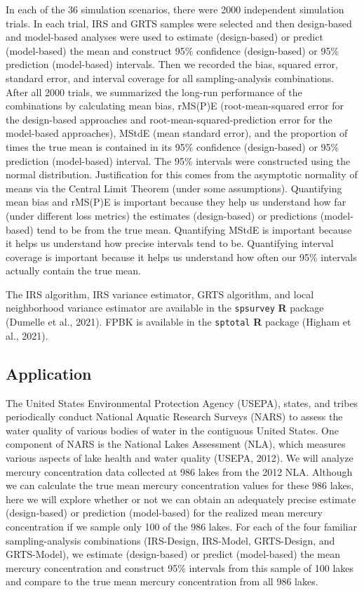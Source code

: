 \documentclass[]{elsarticle} %
\begin{document}
In each of the 36 simulation scenarios, there were 2000 independent
simulation trials. In each trial, IRS and GRTS samples were selected and
then design-based and model-based analyses were used to estimate
(design-based) or predict (model-based) the mean and construct 95\%
confidence (design-based) or 95\% prediction (model-based) intervals.
Then we recorded the bias, squared error, standard error, and interval
coverage for all sampling-analysis combinations. After all 2000 trials,
we summarized the long-run performance of the combinations by
calculating mean bias, rMS(P)E (root-mean-squared error for the
design-based approaches and root-mean-squared-prediction error for the
model-based approaches), MStdE (mean standard error), and the proportion
of times the true mean is contained in its 95\% confidence
(design-based) or 95\% prediction (model-based) interval. The 95\%
intervals were constructed using the normal distribution. Justification
for this comes from the asymptotic normality of means via the Central
Limit Theorem (under some assumptions). Quantifying mean bias and
rMS(P)E is important because they help us understand how far (under
different loss metrics) the estimates (design-based) or predictions
(model-based) tend to be from the true mean. Quantifying MStdE is
important because it helps us understand how precise intervals tend to
be. Quantifying interval coverage is important because it helps us
understand how often our 95\% intervals actually contain the true mean.

The IRS algorithm, IRS variance estimator, GRTS algorithm, and local
neighborhood variance estimator are available in the \texttt{spsurvey}
\textbf{\textsf{R}} package (Dumelle et al., 2021). FPBK is available in
the \texttt{sptotal} \textbf{\textsf{R}} package (Higham et al., 2021).

\hypertarget{sec:mm_app}{%
\subsection{Application}\label{sec:mm_app}}

The United States Environmental Protection Agency (USEPA), states, and
tribes periodically conduct National Aquatic Research Surveys (NARS) to
assess the water quality of various bodies of water in the contiguous
United States. One component of NARS is the National Lakes Assessment
(NLA), which measures various aspects of lake health and water quality
(USEPA, 2012). We will analyze mercury concentration data collected at
986 lakes from the 2012 NLA. Although we can calculate the true mean
mercury concentration values for these 986 lakes, here we will explore
whether or not we can obtain an adequately precise estimate
(design-based) or prediction (model-based) for the realized mean mercury
concentration if we sample only 100 of the 986 lakes. For each of the
four familiar sampling-analysis combinations (IRS-Design, IRS-Model,
GRTS-Design, and GRTS-Model), we estimate (design-based) or predict
(model-based) the mean mercury concentration and construct 95\%
intervals from this sample of 100 lakes and compare to the true mean
mercury concentration from all 986 lakes.
\end{document}
